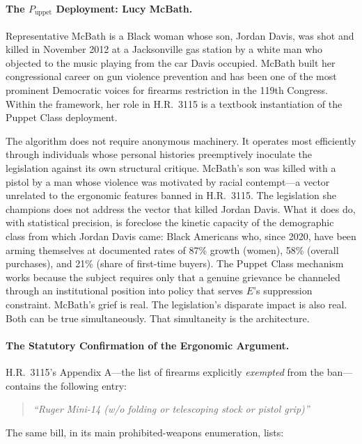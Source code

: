 \paragraph{The $P_{\text{uppet}}$ Deployment: Lucy McBath.}

Representative McBath is a Black woman whose son, Jordan Davis, was shot and killed in November 2012 at a Jacksonville gas station by a white man who objected to the music playing from the car Davis occupied. McBath built her congressional career on gun violence prevention and has been one of the most prominent Democratic voices for firearms restriction in the 119th Congress. Within the framework, her role in H.R.\ 3115 is a textbook instantiation of the Puppet Class deployment.

The algorithm does not require anonymous machinery. It operates most efficiently through individuals whose personal histories preemptively inoculate the legislation against its own structural critique. McBath's son was killed with a pistol by a man whose violence was motivated by racial contempt---a vector unrelated to the ergonomic features banned in H.R.\ 3115. The legislation she champions does not address the vector that killed Jordan Davis. What it does do, with statistical precision, is foreclose the kinetic capacity of the demographic class from which Jordan Davis came: Black Americans who, since 2020, have been arming themselves at documented rates of 87\% growth (women), 58\% (overall purchases), and 21\% (share of first-time buyers). The Puppet Class mechanism works because the subject requires only that a genuine grievance be channeled through an institutional position into policy that serves $E$'s suppression constraint. McBath's grief is real. The legislation's disparate impact is also real. Both can be true simultaneously. That simultaneity is the architecture.

\paragraph{The Statutory Confirmation of the Ergonomic Argument.}

H.R.\ 3115's Appendix A---the list of firearms explicitly \textit{exempted} from the ban---contains the following entry:

\begin{quote}
\textit{``Ruger Mini-14 (w/o folding or telescoping stock or pistol grip)''}
\end{quote}

The same bill, in its main prohibited-weapons enumeration, lists:

